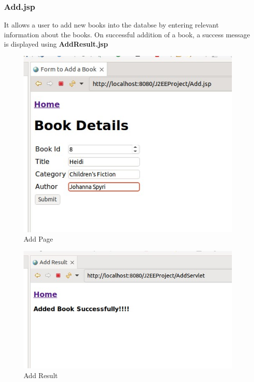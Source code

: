 \documentclass{article}
\begin{document}
\subsubsection{Add.jsp}
It allows a user to add new books into the databse by entering relevant information about the books.
On successful addition of a book, a success message is displayed using \textbf{AddResult.jsp}
\begin{figure}[!ht]
  \begin{center}
    \includegraphics[scale=0.7]{3_add.jpg}
  \caption{Add Page}
  \end{center}
\end{figure}
\begin{figure}[!ht]
  \begin{center}
    \includegraphics[scale=0.7]{3_add_result.jpg}
  \caption{Add Result}
  \end{center}
\end{figure}
\end{document}
